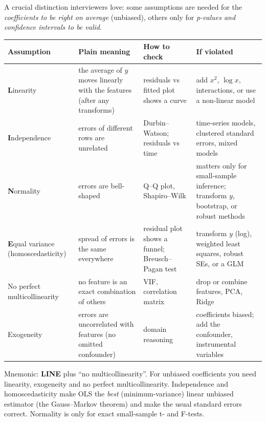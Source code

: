 A crucial distinction interviewers love: some assumptions are needed for the \emph{coefficients to be
right on average} (unbiased), others only for \emph{p-values and confidence intervals to be valid}.

\begin{center}\small
\begin{tabularx}{\linewidth}{l X X X}
\toprule
Assumption & Plain meaning & How to check & If violated\\
\midrule
\textbf{L}inearity & the average of $y$ moves linearly with the features (after any transforms) & residuals vs
fitted plot shows a curve & add $x^2$, $\log x$, interactions, or use a non-linear model\\
\textbf{I}ndependence & errors of different rows are unrelated & Durbin--Watson; residuals vs time & time-series
models, clustered standard errors, mixed models\\
\textbf{N}ormality & errors are bell-shaped & Q--Q plot, Shapiro--Wilk & matters only for small-sample inference;
transform $y$, bootstrap, or robust methods\\
\textbf{E}qual variance (homoscedasticity) & spread of errors is the same everywhere & residual plot shows a
funnel; Breusch--Pagan test & transform $y$ (log), weighted least squares, robust SEs, or a GLM\\
No perfect multicollinearity & no feature is an exact combination of others & VIF, correlation matrix & drop or
combine features, PCA, Ridge\\
Exogeneity & errors are uncorrelated with features (no omitted confounder) & domain reasoning & coefficients
biased; add the confounder, instrumental variables\\
\bottomrule
\end{tabularx}
\end{center}

Mnemonic: \textbf{LINE} plus ``no multicollinearity''. For unbiased coefficients you need linearity,
exogeneity and no perfect multicollinearity. Independence and homoscedasticity make OLS the \emph{best}
(minimum-variance) linear unbiased estimator (the Gauss--Markov theorem) and make the usual standard errors
correct. Normality is only for exact small-sample t- and F-tests.

